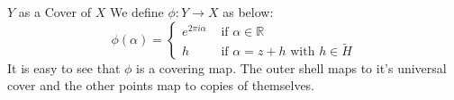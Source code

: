 \documentclass[14pt]{beamer}
\begin{document}
\begin{frame}{$Y$ as a Cover of $X$}
We define \textcolor{colororange}{$\phi:Y\to X$} as below:
\textcolor{colororange}{$$\phi(\alpha)=\begin{cases}
    e^{2\pi i\alpha}&\text{ if }\alpha\in\mathbb R\\
    h&\text{ if }\alpha=z+h\text{ with }h\in \tilde H
\end{cases}$$}\pause
It is easy to see that $\phi$ is a covering  map. The outer shell maps to it's universal cover and the other points map to copies of themselves. 
\begin{center}

\begin{tikzpicture}[x=0.5pt,y=0.5pt,yscale=-1,xscale=1]


\end{tikzpicture}
\end{center}
\end{frame}
\end{document}
